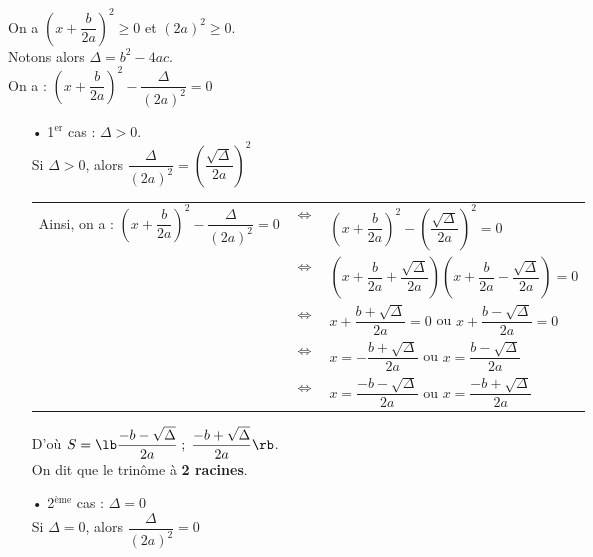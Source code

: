 \vspace*{.3cm}

On a $\left(x + \dfrac{b}{2a}\right)^2 \geqslant 0$ et $\left(2a\right)^2 \geqslant 0$. \\

Notons alors $ \Delta = b^2 - 4ac$. \\

On a : $\left(x + \dfrac{b}{2a} \right)^2 - \dfrac{\Delta}{\left(2a\right)^2} = 0$ 

\begin{itemize}
\item[•] 1$^\mathrm{er}$ cas : $\Delta > 0$. \\

Si $\Delta > 0$, alors $\dfrac{\Delta}{\left(2a\right)^2} = \left(\dfrac{\sqrt{\Delta}}{2a}\right)^2$ \\


\begin{tabular}{lll}
Ainsi, on a : $\left(x + \dfrac{b}{2a} \right)^2 - \dfrac{\Delta}{\left(2a\right)^2} = 0$ & $\Longleftrightarrow$ & $\left(x + \dfrac{b}{2a} \right)^2 - \left(\dfrac{\sqrt{\Delta}}{2a}\right)^2 = 0 $ \\
& $\Longleftrightarrow$ & $\left(x + \dfrac{b}{2a} + \dfrac{\sqrt{\Delta}}{2a}\right)\left(x + \dfrac{b}{2a} - \dfrac{\sqrt{\Delta}}{2a}\right) = 0$ \\
& $\Longleftrightarrow$ & $ x + \dfrac{b + \sqrt{\Delta}}{2a} = 0 $ ou $x + \dfrac{b - \sqrt{\Delta}}{2a} = 0 $ \\
& $\Longleftrightarrow$ & $ x = -\dfrac{b + \sqrt{\Delta}}{2a}$ ou $x = \dfrac{b - \sqrt{\Delta}}{2a}$ \\
& $\Longleftrightarrow$ & $ x = \dfrac{-b - \sqrt{\Delta}}{2a}$ ou $x = \dfrac{-b + \sqrt{\Delta}}{2a}$ \\
\end{tabular}

\vspace*{.3cm}

D'où $ S = \lb \dfrac{-b - \sqrt{\Delta}}{2a} \; ; \; \dfrac{-b + \sqrt{\Delta}}{2a} \rb $. \\ 

On dit que le trinôme à \textbf{2 racines}. \\

\newpage

\item[•] 2$^\mathrm{ème}$ cas : $\Delta = 0$ \\

Si $\Delta = 0$, alors $\dfrac{\Delta}{\left(2a\right)^2} = 0$ \\


\end{itemize}
